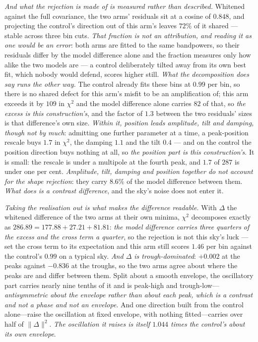 \documentclass[11pt,a4paper]{article}
\theoremstyle{plain}
\theoremstyle{definition}
\theoremstyle{remark}
\begin{document}
\emph{And what the rejection is made of is measured rather than described.} Whitened against the full
covariance, the two arms' residuals sit at a cosine of $0.848$, and projecting the control's direction out of
this arm's leaves $72\%$ of it shared --- stable across three bin cuts. \emph{That fraction is not an
attribution, and reading it as one would be an error}: both arms are fitted to the same bandpowers, so their
residuals differ by the model difference alone and the fraction measures only how alike the two models are ---
a control deliberately tilted away from its own best fit, which nobody would defend, scores higher still.
\emph{What the decomposition does say runs the other way.} The control already fits these bins at $0.99$ per
bin, so there is no shared defect for this arm's misfit to be an amplification of; this arm exceeds it by
$109$ in $\chi^{2}$ and the model difference alone carries $82$ of that, so \emph{the excess is this
construction's}, and the factor of $1.3$ between the two residuals' sizes is that difference's own
size.
\emph{Within it, position leads amplitude, tilt and
damping, though not by much}: admitting one further parameter at a time, a peak-position rescale buys $1.7$ in
$\chi^{2}$, the damping $1.1$ and the tilt $0.4$ --- and on the control the position direction buys nothing at
all, so \emph{the position part is this construction's}. It is small: the rescale is under a multipole at the
fourth peak, and $1.7$ of $287$ is under one per
cent.
\emph{Amplitude, tilt, damping and position together do not account for the shape rejection}: they carry
$8.6\%$ of the model difference between them. \emph{What does is a contrast difference}, and the sky's noise
does not enter it.

\emph{Taking the realisation out is what makes the difference readable.} With $\Delta$ the whitened
difference of the two arms at their own minima, $\chi^{2}$ decomposes exactly as $286.89=177.88+27.21+81.81$:
\emph{the model difference carries three quarters of the excess and the cross term a quarter}, so the
rejection is not this sky's luck --- set the cross term to its expectation and this arm still scores $1.46$
per bin against the control's $0.99$ on a typical sky. \emph{And $\Delta$ is trough-dominated}: $+0.002$ at
the peaks against $-0.836$ at the troughs, so the two arms agree about where the peaks are and differ between
them. Split about a smooth envelope, the oscillatory part carries nearly nine tenths of it and is peak-high and
trough-low---\emph{antisymmetric about the envelope rather than about each peak, which is a contrast and not
a phase and not an envelope}. And one direction built from the control alone---raise the oscillation at fixed envelope, with
nothing fitted---carries over half of
$\lVert\Delta\rVert^{2}$.
\emph{The oscillation it raises is itself $1.044$ times the control's about its own
envelope}.
\end{document}
